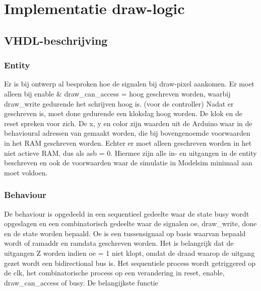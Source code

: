 \documentclass{scrreprt} %
\date{22 november 2013}
\begin{document}
\chapter{Implementatie draw-logic}

\section{VHDL-beschrijving}
\subsection{Entity}
Er is bij ontwerp al besproken hoe de signalen bij draw-pixel aankomen. Er moet alleen bij enable \& draw\_can\_access = hoog geschreven worden, waarbij draw\_write gedurende het schrijven hoog is. (voor de controller)  Nadat er geschreven is, moet done gedurende een klokslag hoog worden. De klok en de reset spreken voor zich. De x, y en color zijn waarden uit de Arduino waar in de behavioural adressen van gemaakt worden, die bij bovengenoemde voorwaarden in het RAM geschreven worden. Echter er moet alleen geschreven worden in het niet actieve RAM, dus als asb = 0.  Hiermee zijn alle in- en uitgangen in de entity beschreven en ook de voorwaarden waar de simulatie in Modelsim minimaal aan moet voldoen. 

\subsection{Behaviour}
De behaviour is opgedeeld in een sequentieel gedeelte waar de state busy wordt opgeslagen en een combinatorisch gedeelte waar de signalen oe, draw\_write, done en de state worden bepaald. Oe is een tussensignaal op basis waarvan bepaald wordt of ramaddr en ramdata geschreven worden. Het is belangrijk dat de uitgangen Z worden indien oe = 1 niet klopt, omdat de draad waarop de uitgang gezet wordt een bidirectional bus is. Het sequentiele process wordt getriggered op de clk, het combinatorische process op een verandering in reset, enable, draw\_can\_access of busy. De belangijkste functie
\end{document}
